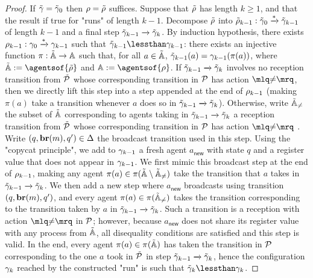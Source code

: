 \begin{proof}
	If $\tilde{\gamma} = \tilde{\gamma}_0$ then $\rho = \tilde{\rho}$ suffices. Suppose that $\tilde{\rho}$ has length $k \geq 1$, and that the result if true for "runs" of length $k-1$. Decompose $\tilde{\rho}$ into $\tilde{\rho}_{k-1}: \tilde{\gamma}_0 \xrightarrow{*} \tilde{\gamma}_{k-1}$ of length $k-1$ and a final step $\tilde{\gamma}_{k-1} \xrightarrow{} \tilde{\gamma}_k$. 
	By induction hypothesis, there exists $\rho_{k-1}: \gamma_0 \xrightarrow{*} \gamma_{k-1}$ such that $\tilde{\config}_{k-1} \lessthan \config_{k-1}$: there exists an injective function $\pi : \tilde{\mathbb{A}} \rightarrow \mathbb{A}$
	such that, for all $a \in \tilde{\mathbb{A}}$, $\tilde{\gamma}_{k-1}(a) = \gamma_{k-1}(\pi(a))$, where $\tilde{\agents} := \agentsof{\tilde{\run}}$ and $\agents := \agentsof{\run}$. If $\tilde{\gamma}_{k-1} \xrightarrow{} \tilde{\gamma}_k$ involves no reception transition from $\tilde{\mathcal{P}}$ whose corresponding transition in $\mathcal{P}$ has action $\quotemarks{\diseqtestact}$, then we directly lift this step into a step appended at the end of $\rho_{k-1}$ (making $\pi(a)$ take a transition whenever $a$ does so in $\tilde{\gamma}_{k-1} \xrightarrow{} \tilde{\gamma}_k$). Otherwise, write $\tilde{\mathbb{A}}_{{\ne}}$ the subset of $\tilde{\mathbb{A}}$ corresponding to agents taking in $\tilde{\gamma}_{k-1} \xrightarrow{} \tilde{\gamma}_k$ a reception transition from $\tilde{\mathcal{P}}$ whose corresponding transition in $\mathcal{P}$ has action $\quotemarks{\diseqtestact}$ . Write $(q, \textbf{br}(m), q') \in \Delta$ the broadcast transition used in this step.  Using the "copycat principle", we add to $\gamma_{k-1}$ a fresh agent $a_{\mathsf{new}}$ with state $q$ and a register value that does not appear in $\gamma_{k-1}$. 
	We first mimic this broadcast step at the end of $\rho_{k-1}$, making any agent $\pi(a) \in \pi(\tilde{\mathbb{A}} \setminus \tilde{\mathbb{A}}_{{\ne}})$ take the transition that $a$ takes in $\tilde{\gamma}_{k-1} \xrightarrow{} \tilde{\gamma}_k$. We then add a new step where $a_{\mathsf{new}}$ broadcasts using transition $(q, \textbf{br}(m), q')$, and every agent $\pi(a) \in \pi(\tilde{\mathbb{A}}_{{\ne}})$ takes the transition corresponding to the transition taken by $a$ in $\tilde{\gamma}_{k-1} \xrightarrow{} \tilde{\gamma}_k$. Such a transition is a reception with action $\quotemarks{\diseqtestact}$ in $\mathcal{P}$; however, because $a_{\mathsf{new}}$ does not share its register value with any process from $\tilde{\mathbb{A}}$, all disequality conditions are satisfied and this step is valid. In the end, every agent $\pi(a) \in \pi(\tilde{\mathbb{A}})$ has taken the transition in $\mathcal{P}$ corresponding to the one $a$ took in $\tilde{\mathcal{P}}$ in step $\tilde{\gamma}_{k-1} \xrightarrow{} \tilde{\gamma}_k$, hence the configuration $\gamma_k$ reached by the constructed "run" is such that $\tilde{\config}_k \lessthan \config_k$. 
\end{proof}

